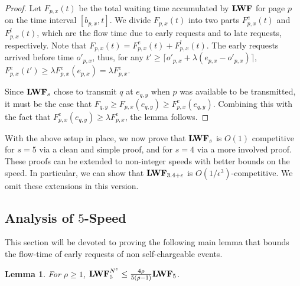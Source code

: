 \documentclass[11pt]{article}
\newtheorem{lemma}{Lemma}[section]
\newcommand{\eps}{\epsilon}
\newcommand{\len}{\mathfrak{\rho}}
\newcommand{\ceil}[1]{\lceil #1 \rceil}
\newcommand{\fe}{F^e}
\begin{document}
\begin{titlepage}
\begin{proof}
  Let $F_{p,x}(t)$ be the total waiting time accumulated by ${\texttt{\bf{LWF}}}$ for
  page $p$ on the time interval $[b_{p,x}, t]$. We divide
  $F_{p,x}(t)$ into two parts $F^e_{p,x}(t)$ and $F^l_{p,x}(t)$, which
  are the flow time due to early requests and to late requests,
  respectively. Note that $F_{p,x}(t) = F^e_{p,x}(t) + F^l_{p,x}(t)$.
  The early requests arrived before time $o'_{p,x}$, thus, for any $t'
  \ge \ceil{o'_{p,x} + \lambda (e_{p,x} - o'_{p,x})}$, $F^e_{p,x}(t')
  \geq \lambda \fe_{p,x}(e_{p,x}) = \lambda \fe_{p,x}$.

  Since ${\texttt{\bf{LWF}}}_s$ chose to transmit $q$ at $e_{q,y}$ when $p$ was
  available to be transmitted, it must be the case that $ F_{q,y} \ge
  F_{p,x}(e_{q, y}) \ge \fe_{p,x}(e_{q, y})$. Combining this with the
  fact that $\fe_{p,x}(e_{q, y}) \ge \lambda \fe_{p,x}$, the lemma follows.

\end{proof}

With the above setup in place, we now prove that ${\texttt{\bf{LWF}}}_s$ is $O(1)$
competitive for $s=5$ via a clean and simple proof, and for $s=4$ via
a more involved proof. These proofs can be extended to non-integer
speeds with better bounds on the speed. In particular, we can show
that $\lwf_{3.4 + \epsilon}$ is $O(1/\eps^3)$-competitive. We omit
these extensions in this version.

\iffalse First it is shown that with $5$-speed the algorithm $\lwf_5$ achieves a competitive ratio of $O(1)$. This
proof is simple and is used to illustrate our techniques.  If non-integer speeds are allowed, this proof can be
extended to show that $\lwf_{4+\eps}$ is $O(1/\epsilon^2)$-competitive. We later improve our analysis to $4$-speed with
a competitive ratio of $O(1)$. If non-integer speeds are used, this proof can be extended to show $\lwf_{3.4 +
\epsilon}$ is $O(1/\eps^3)$-competitive. \fi \vspace{-3mm}
\subsection{Analysis of $5$-Speed}\vspace{-2mm}
\label{sec:5speed}

This section will be devoted to proving the following main lemma that
bounds the flow-time of early requests of non self-chargeable events.

\begin{lemma}
  \label{lem:5speedNSC} For $\len \geq 1$, $\lwf_5^{N^e} \leq \frac{4
    \len}{5(\len-1)} \lwf_{5}$.
\end{lemma}


\end{titlepage}
\end{document}
